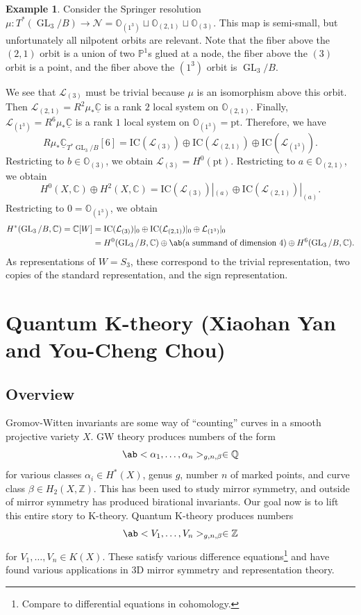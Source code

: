 \documentclass{amsart}
\theoremstyle{definition}
\newtheorem{exm}[thm]{Example}
\theoremstyle{remark}
\theoremstyle{plain}
\theoremstyle{definition}
\theoremstyle{remark}
\newcommand{\C}{\mathbb{C}}
\newcommand{\Z}{\mathbb{Z}}
\newcommand{\Q}{\mathbb{Q}}
\renewcommand{\P}{\mathbb{P}}
\newcommand{\mc}[1]{\mathcal{#1}}
\newcommand{\mr}[1]{\mathrm{#1}}
\newcommand{\on}[1]{\operatorname{#1}}
\newcommand{\ul}[1]{\underline{#1}}
\newcommand{\1}{\mathbf{1}}
\newcommand{\2}{\mathbf{2}}
\newcommand{\3}{\mathbf{3}}
\begin{document}
\begin{exm}
    Consider the Springer resolution \(\mu \colon T^*(\on{GL}_3/B) \to \mc{N} = \mathbb{O}_{(1^3)} \sqcup \mathbb{O}_{(2,1)} \sqcup \mathbb{O}_{(3)}\). This map is semi-small, but unfortunately all nilpotent orbits are relevant. Note that the fiber above the \((2,1)\) orbit is a union of two \(\P^1\)s glued at a node, the fiber above the \((3)\) orbit is a point, and the fiber above the \((1^3)\) orbit is \(\on{GL}_3/B\).

    We see that \(\mc{L}_{(3)}\) must be trivial because \(\mu\) is an isomorphism above this orbit. Then \(\mc{L}_{(2,1)} = R^2 \mu_* \ul{\C}\) is a rank \(2\) local system on \(\mathbb{O}_{(2,1)}\). Finally, \(\mc{L}_{(1^3)} = R^6 \mu_* \ul{\C}\) is a rank \(1\) local system on \(\mathbb{O}_{(1^3)} = \mr{pt}\). Therefore, we have
    \[ R \mu_* \ul{\C}_{T^*\on{GL}_3/B}[6] = \mr{IC}(\mc{L}_{(3)}) \oplus \mr{IC}(\mc{L}_{(2,1)}) \oplus \mr{IC}(\mc{L}_{(1^3)}). \]
    Restricting to \(b \in \mathbb{O}_{(3)}\), we obtain \(\mc{L}_{(3)} = H^0(\mr{pt})\). Restricting to \(a \in \mathbb{O}_{(2,1)}\), we obtain
    \[ H^0(X, \C) \oplus H^2(X, \C) = \mr{IC}(\mc{L}_{(3)})|_{(a)} \oplus \mr{IC}(\mc{L}_{(2,1)})|_{(a)}. \]
    Restricting to \(0 = \mathbb{O}_{(1^3)}\), we obtain
    \begin{align*}
        H^*(\on{GL}_3/B, \C) = \C[W] &= \mr{IC}(\mc{L}_{(3)})|_0 \oplus \mr{IC}(\mc{L}_{(2,1)})|_0 \oplus \mc{L}_{(1^3)}|_0 \\
        &= H^0(\on{GL}_3/B, \C) \oplus \ab(\text{a summand of dimension } 4) \oplus H^6(\on{GL}_3/B, \C).
    \end{align*}
    As representations of \(W = S_3\), these correspond to the trivial representation, two copies of the standard representation, and the sign representation.
\end{exm}

\section{Quantum K-theory (Xiaohan Yan and You-Cheng Chou)}%
\label{sec:Quantum K-theory (Xiaohan Yan and You-Cheng Chou)}

\subsection{Overview}%
\label{sub:Overview}

Gromov-Witten invariants are some way of ``counting'' curves in a smooth projective variety \(X\). GW theory produces numbers of the form
\[ \ab<\alpha_1, \ldots, \alpha_n>_{g, n, \beta} \in \Q \]
for various classes \(\alpha_i \in H^*(X)\), genus \(g\), number \(n\) of marked points, and curve class \(\beta \in H_2(X, \Z)\). This has been used to study mirror symmetry, and outside of mirror symmetry has produced birational invariants. Our goal now is to lift this entire story to K-theory. Quantum K-theory produces numbers
\[ \ab<V_1, \ldots, V_n>_{g, n, \beta} \in \Z \]
for \(V_1, \ldots, V_n \in K(X)\). These satisfy various difference equations\footnote{Compare to differential equations in cohomology.} and have found various applications in 3D mirror symmetry and representation theory.
\end{document}

